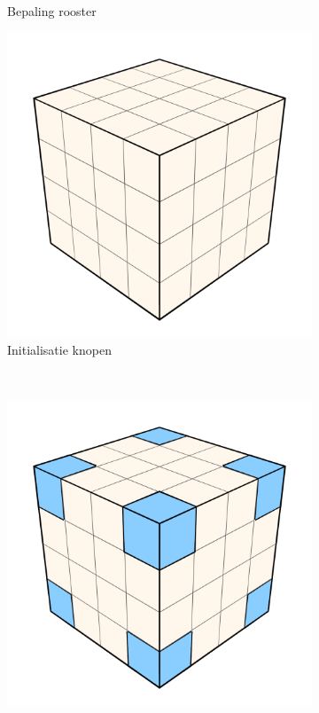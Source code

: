 \begin{figure}[t]
\begin{subfigure}[b]{.3\linewidth}
    \caption{Bepaling rooster}%
    \label{fig:hs-p1b}%
  \end{subfigure}
  \begin{subfigure}[b]{.3\linewidth}
    \includegraphics[width=\textwidth]{./img/raw/hs-slt-algorithm/hs-slt-algorithm-3.png}%
    \caption{Initialisatie knopen}%
    \label{fig:hs-p1c}%
  \end{subfigure}
  \\
  \begin{subfigure}[b]{.3\linewidth}
    \includegraphics[width=\textwidth]{./img/raw/hs-slt-algorithm/hs-slt-algorithm-4.png}%

\end{subfigure}
\end{figure}
